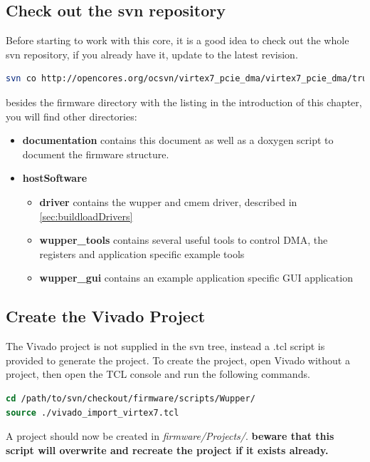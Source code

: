 \subsection{Check out the svn repository}
Before starting to work with this core, it is a good idea to check out the whole svn repository, if you already have it, update to the latest revision.
\begin{lstlisting}[frame=single, language=Bash, caption=svn checkout]
svn co http://opencores.org/ocsvn/virtex7_pcie_dma/virtex7_pcie_dma/trunk 
\end{lstlisting}
besides the firmware directory with the listing in the introduction of this chapter, you will find other directories:\\
\begin{itemize}
\item \textbf{documentation} contains this document as well as a doxygen script to document the firmware structure.
\item \textbf{hostSoftware}
	\begin{itemize}
		\item \textbf{driver} contains the wupper and cmem driver, described in \ref{sec:buildloadDrivers}
		\item \textbf{wupper\_tools} contains several useful tools to control DMA, the registers and application specific example tools
		\item \textbf{wupper\_gui}	contains an example application specific GUI application
	\end{itemize}
\end{itemize}

\subsection{Create the Vivado Project}
The Vivado project is not supplied in the svn tree, instead a .tcl script is provided to generate the project. To create the project, open Vivado without a project, then open the TCL console and run the following commands.
\begin{lstlisting}[frame=single, language=tcl,     caption=Create Vivado Project]
cd /path/to/svn/checkout/firmware/scripts/Wupper/
source ./vivado_import_virtex7.tcl
\end{lstlisting}
A project should now be created in \textit{firmware/Projects/}. \textbf{beware that this script will overwrite and recreate the project if it exists already.}

